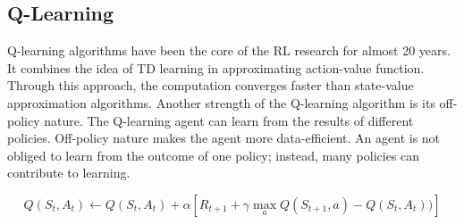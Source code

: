 \subsection{Q-Learning}

Q-learning algorithms have been the core of the RL research for almost 20 years. It combines the idea of TD learning in approximating action-value function. Through this approach, the computation converges faster than state-value approximation algorithms. Another strength of the Q-learning algorithm is its off-policy nature. The Q-learning agent can learn from the results of different policies. Off-policy nature makes the agent more data-efficient. An agent is not obliged to learn from the outcome of one policy; instead, many policies can contribute to learning.

\begin{equation}
    Q(S_t, A_t) \longleftarrow Q(S_t, A_t) + \alpha [R_{t+1} + \gamma \max\limits_{a}Q(S_{t+1}, a)- Q(S_t, A_t))] 
\end{equation}

